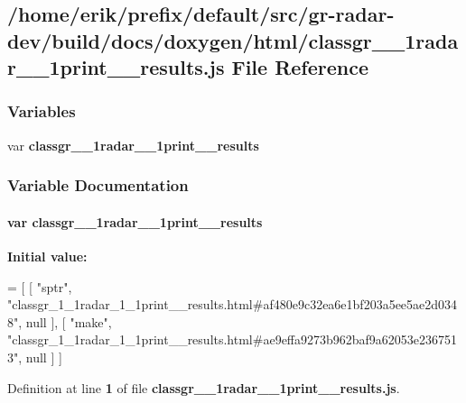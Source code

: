 \subsection{/home/erik/prefix/default/src/gr-\/radar-\/dev/build/docs/doxygen/html/classgr\+\_\+\_\+1radar\+\_\+\_\+1print\+\_\+\+\_\+results.js File Reference}
\label{classgr__1__1radar__1__1print____results_8js}
\subsubsection*{Variables}
\begin{DoxyCompactItemize}
\item 
var {\bf classgr\+\_\+\_\+1radar\+\_\+\_\+1print\+\_\+\+\_\+results}
\end{DoxyCompactItemize}


\subsubsection{Variable Documentation}
\paragraph[{classgr\+\_\+1\+\_\+1radar\+\_\+1\+\_\+1print\+\_\+\+\_\+results}]{\setlength{\rightskip}{0pt plus 5cm}var classgr\+\_\+\_\+1radar\+\_\+\_\+1print\+\_\+\+\_\+results}\label{classgr__1__1radar__1__1print____results_8js_a7b2c6ababd28e3281dd997b838e58c2f}
{\bfseries Initial value\+:}
\begin{DoxyCode}
=
[
    [ \textcolor{stringliteral}{"sptr"}, \textcolor{stringliteral}{"classgr\_1\_1radar\_1\_1print\_\_results.html#af480e9c32ea6e1bf203a5ee5ae2d0348"}, null ],
    [ \textcolor{stringliteral}{"make"}, \textcolor{stringliteral}{"classgr\_1\_1radar\_1\_1print\_\_results.html#ae9effa9273b962baf9a62053e2367513"}, null ]
]
\end{DoxyCode}


Definition at line {\bf 1} of file {\bf classgr\+\_\+\_\+1radar\+\_\+\_\+1print\+\_\+\+\_\+results.\+js}.

